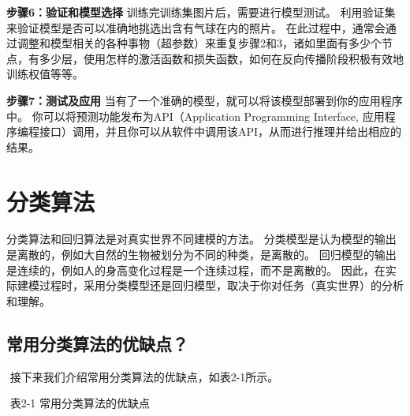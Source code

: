 \textbf{步骤6：验证和模型选择} ​
训练完训练集图片后，需要进行模型测试。
利用验证集来验证模型是否可以准确地挑选出含有气球在内的照片。
​
在此过程中，通常会通过调整和模型相关的各种事物（超参数）来重复步骤2和3，诸如里面有多少个节点，有多少层，使用怎样的激活函数和损失函数，如何在反向传播阶段积极有效地训练权值等等。

\textbf{步骤7：测试及应用} ​
当有了一个准确的模型，就可以将该模型部署到你的应用程序中。
你可以将预测功能发布为API（Application Programming Interface, 应用程序编程接口）调用，并且你可以从软件中调用该API，从而进行推理并给出相应的结果。

\section{ 分类算法}
\label{ux5206ux7c7bux7b97ux6cd5}
分类算法和回归算法是对真实世界不同建模的方法。
分类模型是认为模型的输出是离散的，例如大自然的生物被划分为不同的种类，是离散的。
回归模型的输出是连续的，例如人的身高变化过程是一个连续过程，而不是离散的。
因此，在实际建模过程时，采用分类模型还是回归模型，取决于你对任务（真实世界）的分析和理解。

\subsection{常用分类算法的优缺点？}
\label{ux5e38ux7528ux5206ux7c7bux7b97ux6cd5ux7684ux4f18ux7f3aux70b9}

​ 接下来我们介绍常用分类算法的优缺点，如表2-1所示。

​ 表2-1 常用分类算法的优缺点

